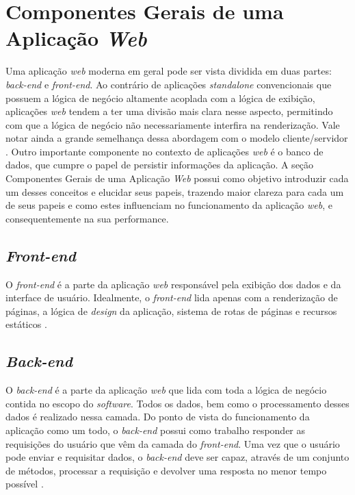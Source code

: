\section{Componentes Gerais de uma Aplicação \textit{Web}}

Uma aplicação \textit{web} moderna em geral pode ser vista dividida em duas partes: \textit{back-end} e \textit{front-end}. Ao contrário de aplicações \textit{standalone} convencionais que possuem a lógica de negócio altamente acoplada com a lógica de exibição, aplicações \textit{web} tendem a ter uma divisão mais clara nesse aspecto, permitindo com que a lógica de negócio não necessariamente interfira na renderização. Vale notar ainda a grande semelhança dessa abordagem com o modelo cliente/servidor \cite{gong2020architecture}. Outro importante componente no contexto de aplicações \textit{web} é o banco de dados, que cumpre o papel de persistir informações da aplicação. A seção Componentes Gerais de uma Aplicação \textit{Web} possui como objetivo introduzir cada um desses conceitos e elucidar seus papeis, trazendo maior clareza para cada um de seus papeis e como estes influenciam no funcionamento da aplicação \textit{web}, e consequentemente na sua performance.

\subsection{\textit{Front-end}}

O \textit{front-end} é a parte da aplicação \textit{web} responsável pela exibição dos dados e da interface de usuário. Idealmente, o \textit{front-end} lida apenas com a renderização de páginas, a lógica de \textit{design} da aplicação, sistema de rotas de páginas e recursos estáticos \cite{gong2020architecture}.

\subsection{\textit{Back-end}}

O \textit{back-end} é a parte da aplicação \textit{web} que lida com toda a lógica de negócio contida no escopo do \textit{software}. Todos os dados, bem como o processamento desses dados é realizado nessa camada. Do ponto de vista do funcionamento da aplicação como um todo, o \textit{back-end} possui como trabalho responder as requisições do usuário que vêm da camada do \textit{front-end}. Uma vez que o usuário pode enviar e requisitar dados, o \textit{back-end} deve ser capaz, através de um conjunto de métodos, processar a requisição e devolver uma resposta no menor tempo possível \cite{adam2019backend}.

